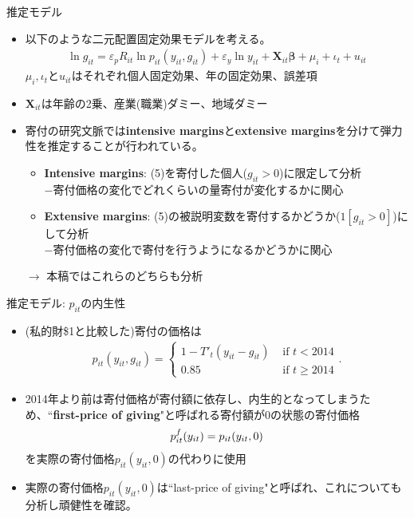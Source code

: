 \documentclass[dvipdfmx,10pt]{beamer}
\begin{document}
\begin{frame}{推定モデル}
	\begin{itemize}
		\item 以下のような二元配置固定効果モデルを考える。
		\begin{align}
			\ln g_{it} = \varepsilon_pR_{it} \ln p_{it}(y_{it}, g_{it}) + \varepsilon_y \ln y_{it} + \bm{X}_{it}\bm{\beta} + \mu_i + \iota_t + u_{it}\tag{5}
		\end{align}
	$\mu_i, \iota_t$と$ u_{it}$はそれぞれ個人固定効果、年の固定効果、誤差項 
	\item $\bm{X}_{it}$は年齢の2乗、産業(職業)ダミー、地域ダミー
	\item 寄付の研究文脈では\textbf{intensive margins}と\textbf{extensive margins}を分けて弾力性を推定することが行われている。
	\begin{itemize}
		\item \textbf{Intensive margins}: (5)を寄付した個人($g_{it}>0$)に限定して分析\\
		$-$寄付価格の変化でどれくらいの量寄付が変化するかに関心
		\item \textbf{Extensive margins}: (5)の被説明変数を寄付するかどうか($1[g_{it}>0]$)にして分析\\
		$-$寄付価格の変化で寄付を行うようになるかどうかに関心
	\end{itemize}
	$\to$ 本稿ではこれらのどちらも分析
	\end{itemize}
\end{frame}

\begin{frame}{推定モデル: $p_{it}$の内生性}
	\begin{itemize}
		\item (私的財\$1と比較した)寄付の価格は
		\begin{align}
			p_{it}(y_{it}, g_{it})=\begin{cases}
			1-T'_t(y_{it}-g_{it})&\text{ if }t<2014\\
			0.85&\text{ if }t\ge2014
			\end{cases}
			\tag{6'}.
		\end{align}
		\item 2014年より前は寄付価格が寄付額に依存し、内生的となってしまうため、``\textbf{first-price of giving}"と呼ばれる寄付額が0の状態の寄付価格
		\begin{align}
			p_{it}^f(y_{it})=p_{it}(y_{it},0)\notag
		\end{align}
		を実際の寄付価格$p_{it}(y_{it},0)$の代わりに使用
		\item 実際の寄付価格$p_{it}(y_{it},0)$は``last-price of giving"と呼ばれ、これについても分析し頑健性を確認。
	\end{itemize}
\end{frame}
\end{document}

